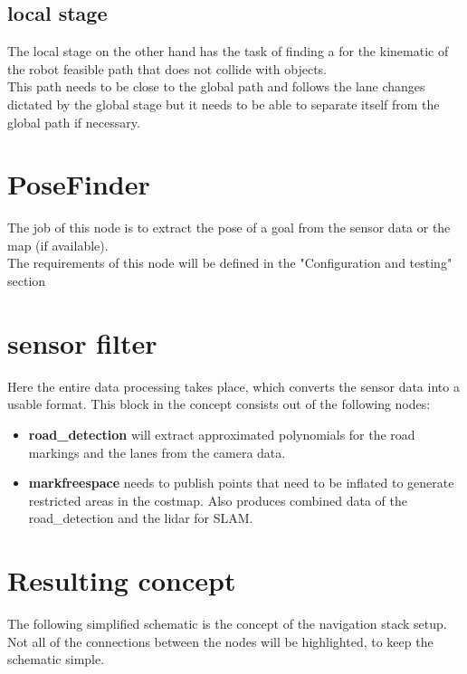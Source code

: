 \subsection{local stage}
The local stage on the other hand has the task of finding a for the kinematic of the robot feasible path that does not collide with objects.\\
This path needs to be close to the global path and follows the lane changes dictated by the global stage but it needs to be able to separate itself from the global path if necessary.

\section{PoseFinder}
The job of this node is to extract the pose of a goal from the sensor data or the map (if available).\\

The requirements of this node will be defined in the "Configuration and testing" section
\section{sensor filter}
Here the entire data processing takes place, which converts the sensor data into a usable format. This block in the concept consists out of the following nodes:

\begin{itemize}
	\item \textbf{road\_detection} will extract approximated polynomials for the road markings and the lanes from the camera data.
	\item \textbf{markfreespace} needs to publish points that need to be inflated to generate restricted areas in the costmap. Also produces combined data of the road\_detection and the lidar for SLAM.
\end{itemize}


\section{Resulting concept}
The following simplified schematic is the concept of the navigation stack setup. Not all of the connections between the nodes will be highlighted, to keep the schematic simple.\\


